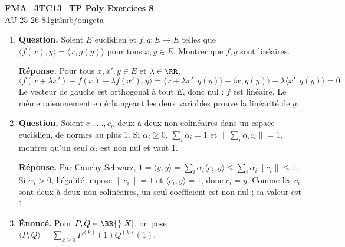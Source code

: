 \documentclass[12pt, a4paper]{article}
\newcommand{\mytitle}{FMA\_3TC13\_TP Poly Exercices 8}
\newcommand{\myauthor}{github/omgeta}
\newcommand{\mydate}{AU 25-26 S1}
\begin{document}
\raggedright
\footnotesize
\begin{center}
{\normalsize{\textbf{\mytitle}}} \\
{\footnotesize{\mydate\hspace{2pt}\textemdash\hspace{2pt}\myauthor}}
\end{center}
\begin{enumerate}[label=8.\arabic*., start=70]

  \item \begin{minipage}[t]{\linewidth}\raggedright
\textbf{Question.} Soient $E$ euclidien et $f,g:E\to E$ telles que $\langle f(x),y\rangle=\langle x,g(y)\rangle$ pour tous $x,y\in E$. Montrer que $f,g$ sont linéaires.
\par\smallskip
\textbf{Réponse.} Pour tous $x,x',y\in E$ et $\lambda\in\RR$,
    \[
      \langle f(x+\lambda x')-f(x)-\lambda f(x'),y\rangle
      =\langle x+\lambda x',g(y)\rangle-\langle x,g(y)\rangle-\lambda\langle x',g(y)\rangle=0
    \]
    Le vecteur de gauche est orthogonal à tout $E$, donc nul : $f$ est linéaire.
    Le même raisonnement en échangeant les deux variables prouve la linéarité de $g$.
\end{minipage}

  \item \begin{minipage}[t]{\linewidth}\raggedright
\textbf{Question.} Soient $c_1,\ldots,c_n$ deux à deux non colinéaires dans un espace euclidien, de normes au plus $1$. Si $\alpha_i\geq0$, $\sum_i\alpha_i=1$ et $\|\sum_i\alpha_i c_i\|=1$, montrer qu’un seul $\alpha_i$ est non nul et vaut $1$.
\par\smallskip
\textbf{Réponse.} Par Cauchy-Schwarz,
    $1=\langle y,y\rangle=\sum_i\alpha_i\langle c_i,y\rangle
      \leq\sum_i\alpha_i\|c_i\|\leq1$.
    Si $\alpha_i>0$, l'égalité impose $\|c_i\|=1$ et $\langle c_i,y\rangle=1$, donc $c_i=y$.
    Comme les $c_i$ sont deux à deux non colinéaires, un seul coefficient est non nul ; sa valeur est $1$.
\end{minipage}

  \item \begin{minipage}[t]{\linewidth}\raggedright
\textbf{Énoncé.} Pour $P,Q\in\RR{}[X]$, on pose $\langle P,Q\rangle=\sum_{k\geq0}P^{(k)}(1)Q^{(k)}(1)$.


\end{minipage}
\end{enumerate}
\end{document}
